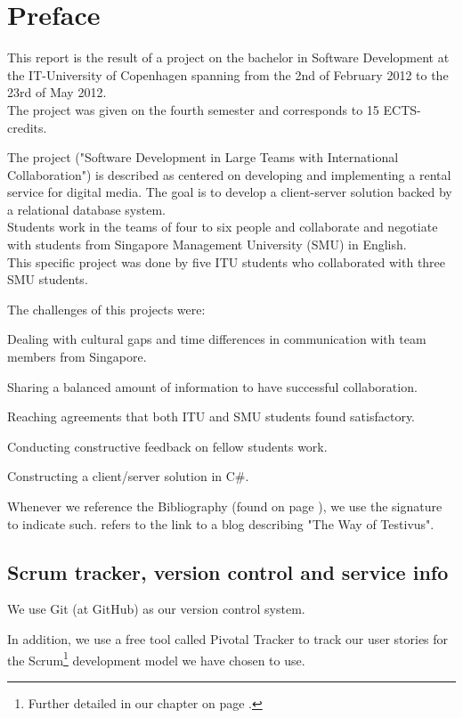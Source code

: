 \chapter{Preface}
\label{Preface}
This report is the result of a project on the bachelor in Software Development at the IT-University of Copenhagen spanning from the 2nd of February 2012 to the 23rd of May 2012. \\The project was given on the fourth semester and corresponds to 15 ECTS-credits.

The project ("Software Development in Large Teams with International Collaboration") is described as centered on developing and implementing a rental service for digital media. The goal is to develop a client-server solution backed by a relational database system. \\Students work in the teams of four to six people and collaborate and negotiate with students from Singapore Management University (SMU) in English.\\This specific project was done by five ITU students who collaborated with three SMU students.

The challenges of this projects were:
\begin{my_itemize}
\item Dealing with cultural gaps and time differences in communication with team members from Singapore.
\item Sharing a balanced amount of information to have successful collaboration.
\item Reaching agreements that both ITU and SMU students found satisfactory.
\item Conducting constructive feedback on fellow students work.
\item Constructing a client/server solution in C\#.
\end{my_itemize}
Whenever we reference the Bibliography (found on page \pageref{Biblio}), we use the signature \cite{WoT} to indicate such. \cite{WoT} refers to the link to a blog describing "The Way of Testivus".

\section{Scrum tracker, version control and service info}
\label{Preface_Trackers}
We use Git (at GitHub) as our version control system.

In addition, we use a free tool called Pivotal Tracker to track our user stories for the Scrum\footnote{Further detailed in our  chapter on page \pageref{Collaboration}.} development model we have chosen to use.

